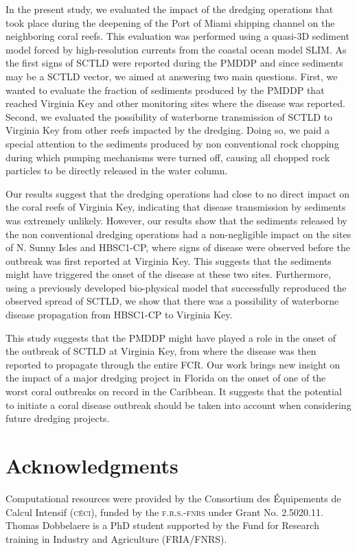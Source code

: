 \documentclass[preprint,12pt,authoryear]{elsarticle}
\begin{document}
In the present study, we evaluated the impact of the dredging operations that took place during the deepening of the Port of Miami shipping channel on the neighboring coral reefs. This evaluation was performed using a quasi-3D sediment model forced by high-resolution currents from the coastal ocean model SLIM. As the first signs of SCTLD were reported during the PMDDP and since sediments may be a SCTLD vector, we aimed at answering two main questions. First, we wanted to evaluate the fraction of sediments produced by the PMDDP that reached Virginia Key and other monitoring sites where the disease was reported. Second, we evaluated the possibility of waterborne transmission of SCTLD to Virginia Key from other reefs impacted by the dredging. Doing so, we paid a special attention to the sediments produced by non conventional rock chopping during which pumping mechanisms were turned off, causing all chopped rock particles to be directly released in the water column.

Our results suggest that the dredging operations had close to no direct impact on the coral reefs of Virginia Key, indicating that disease transmission by sediments was extremely unlikely. However, our results show that the sediments released by the non conventional dredging operations had a non-negligible impact on the sites of N. Sunny Isles and HBSC1-CP, where signs of disease were observed before the outbreak was first reported at Virginia Key. This suggests that the sediments might have triggered the onset of the disease at these two sites. Furthermore, using a previously developed bio-physical model that successfully reproduced the observed spread of SCTLD, we show that there was a possibility of waterborne disease propagation from HBSC1-CP to Virginia Key.

This study suggests that the PMDDP might have played a role in the onset of the outbreak of SCTLD at Virginia Key, from where the disease was then reported to propagate through the entire FCR. Our work brings new insight on the impact of a major dredging project in Florida on the onset of one of the worst coral outbreaks on record in the Caribbean. It suggests that the potential to initiate a coral disease outbreak should be taken into account when considering future dredging projects.

\section*{Acknowledgments}
Computational resources were provided by the Consortium des \'Equipements de Calcul Intensif (\textsc{c\'eci}), funded by the \textsc{f.r.s.-fnrs} under Grant No. 2.5020.11. Thomas Dobbelaere is a PhD student supported by the Fund for Research training in Industry and Agriculture (\textsc{FRIA}/\textsc{FNRS}).
\end{document}
